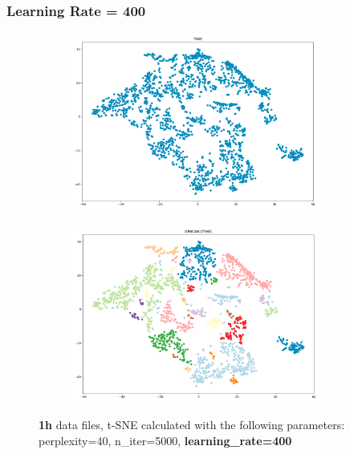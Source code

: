 \subsubsection{Learning Rate = 400}
\begin{figure}[H]
  \centering
  \begin{subfigure}{.5\textwidth}
    \centering
    \includegraphics[width=0.9\textwidth]{./images/tsneParametersTest/learningRate/lr400-1hTSNE.png}
  \end{subfigure}%
  \begin{subfigure}{.5\textwidth}
    \centering
    \includegraphics[width=0.9\textwidth]{./images/tsneParametersTest/learningRate/lr400-1hDBSCAN.png}
  \end{subfigure}
	\caption{\textbf{1h} data files, t-SNE calculated with the following parameters: perplexity=40, n\_iter=5000, \textbf{learning\_rate=400}}
	\label{figure:1hlr400TSNE}
\end{figure}

